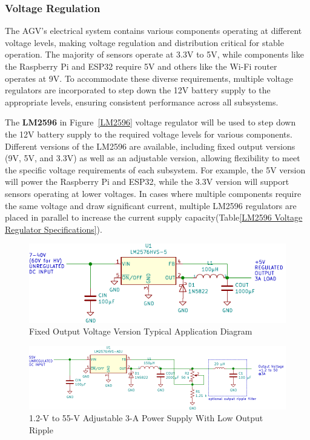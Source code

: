 \documentclass[../../main]{subfiles}
\begin{document}
\subsubsection{Voltage Regulation}

The AGV's electrical system contains various components operating 
at different voltage levels, making voltage regulation and 
distribution critical for stable operation. The majority of 
sensors operate at 3.3V to 5V, while components like the Raspberry Pi 
and ESP32 require 5V and others like the Wi-Fi router operates at 9V. 
To accommodate these diverse requirements, multiple voltage regulators 
are incorporated to step down the 12V battery supply to the appropriate 
levels, ensuring consistent performance across all subsystems. 


The \textbf{LM2596} in Figure~\ref{LM2596} voltage regulator will be used to step down the 12V battery 
supply to the required voltage levels for various components. Different 
versions of the LM2596 are available, including fixed output versions 
(9V, 5V, and 3.3V) as well as an adjustable version, allowing flexibility 
to meet the specific voltage requirements of each subsystem. For example, 
the 5V version will power the Raspberry Pi and ESP32, while the 3.3V version 
will support sensors operating at lower voltages. In cases where multiple 
components require the same voltage and draw significant current, multiple 
LM2596 regulators are placed in parallel to increase the current supply 
capacity(Table\ref{LM2596 Voltage Regulator Specifications}).

\begin{figure} 
    \centering
    \includegraphics[width=0.7\textheight]{fig/lm2576.pdf}
    \caption{ Fixed Output Voltage Version Typical Application Diagram}
    \label{LM2596 Fixed Output Voltage} 
\end{figure}

\begin{figure} 
    \centering
    \includegraphics[width=0.7\textheight]{fig/lm2576_module_adj.pdf}
    \caption{1.2-V to 55-V Adjustable 3-A Power Supply With Low Output Ripple}
    \label{LM2596 Adjustable Output Voltage} 
\end{figure}
\end{document}
